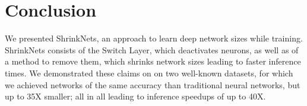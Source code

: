 \section{Conclusion}

We presented ShrinkNets, an approach to learn deep network sizes while training.
ShrinkNets consists of the Switch Layer, which deactivates neurons, as well as
of a method to remove them, which shrinks network sizes leading to faster
inference times. We demonstrated these claims on on two well-known datasets, for
which we achieved networks of the same accuracy than traditional neural
networks, but up to 35X smaller; all in all leading to inference speedups of up
to 40X.

